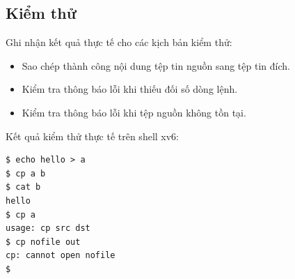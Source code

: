 \subsection{Kiểm thử}
Ghi nhận kết quả thực tế cho các kịch bản kiểm thử:
\begin{itemize}
  \item Sao chép thành công nội dung tệp tin nguồn sang tệp tin đích.
  \item Kiểm tra thông báo lỗi khi thiếu đối số dòng lệnh.
  \item Kiểm tra thông báo lỗi khi tệp nguồn không tồn tại.
\end{itemize}

\noindent Kết quả kiểm thử thực tế trên shell xv6:

\begin{center}
\begin{minipage}{0.86\textwidth}
\begin{lstlisting}[numbers=none,xleftmargin=0pt,framexleftmargin=0pt]
$ echo hello > a
$ cp a b
$ cat b
hello
$ cp a
usage: cp src dst
$ cp nofile out
cp: cannot open nofile
$
\end{lstlisting}
\end{minipage}
\end{center}
